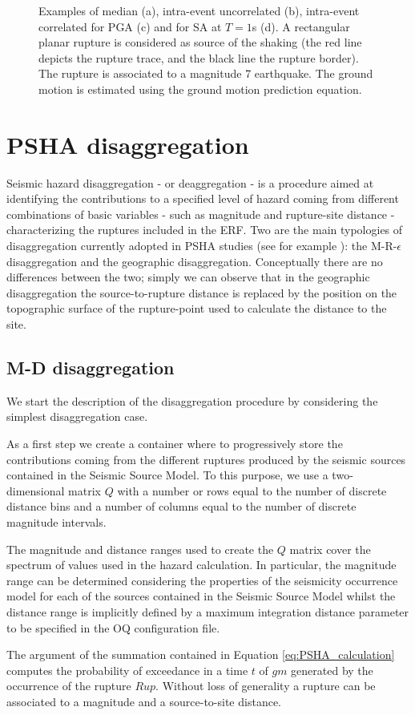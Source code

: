 \begin{figure}[htbp]
\caption{Examples of median (a), intra-event uncorrelated (b), intra-event 
correlated for PGA (c) and for SA at $T=1$s (d). A rectangular planar rupture 
is considered as source of the shaking (the red line depicts the rupture trace,
and the black line the rupture border). The rupture is associated to a 
magnitude 7 earthquake. The ground motion is estimated using the 
\citet{boore2008} ground motion prediction equation.}
\label{fig:gmfs}
\end{figure}
%
\clearpage\newpage
\section{PSHA disaggregation}
\label{chap:disaggregation}
%
Seismic hazard disaggregation - or deaggregation - 
\citep{mcguire1995,bazzurro1999} is a procedure aimed at identifying the 
contributions to a specified level of hazard coming from different combinations
of basic variables - such as magnitude and rupture-site distance - 
characterizing the ruptures included in the ERF.
%
Two are the main typologies of disaggregation currently adopted in PSHA 
studies (see for example \citet{petersen2008}): the M-R-$\epsilon$ 
disaggregation and the geographic disaggregation. Conceptually there 
are no differences between the two; simply we can observe that in the 
geographic disaggregation the source-to-rupture distance is replaced by
the position on the topographic surface of the rupture-point used to 
calculate the distance to the site.
%

\subsection{M-D disaggregation}
We start the description of the disaggregation procedure by considering 
the  simplest disaggregation case. 

As a first step we create a container where to progressively store the 
contributions coming from the different ruptures produced by the seismic 
sources contained in the Seismic Source Model.
%
To this purpose, we use a two-dimensional matrix $Q$ with a number or 
rows equal to the number of discrete distance bins and a number of 
columns equal to the number of discrete magnitude intervals. 

The magnitude and distance ranges used to create the $Q$ matrix cover 
the spectrum of values used in the hazard calculation. In particular, 
the magnitude range can be determined considering the properties of 
the seismicity occurrence model for each of the sources contained in
the Seismic Source Model whilst the distance range is implicitly defined
by a maximum integration distance parameter to be specified in the OQ 
configuration file. 
%

The argument of the summation contained in Equation \ref{eq:PSHA_calculation} 
computes the probability of exceedance in a time $t$ of $gm$ generated by the 
occurrence of the rupture $Rup$. Without loss of generality a rupture can be
associated to a magnitude and a source-to-site distance.